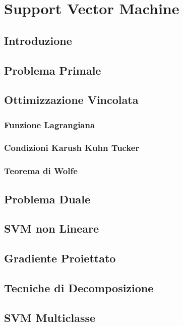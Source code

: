 \documentclass{report}
\begin{document}
\chapter{Support Vector Machine}

\section{Introduzione}



\section{Problema Primale}



\section{Ottimizzazione Vincolata}



\subsection{Funzione Lagrangiana}



\subsection{Condizioni Karush Kuhn Tucker}



\subsection{Teorema di Wolfe}



\section{Problema Duale}



\section{SVM non Lineare}



\section{Gradiente Proiettato}



\section{Tecniche di Decomposizione}



\section{SVM Multiclasse}

 
\end{document}
